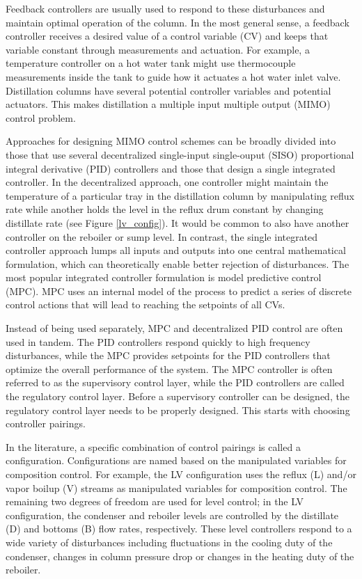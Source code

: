 Feedback controllers are usually used to respond to these disturbances and maintain optimal operation of the column.  In the most general sense, a feedback controller receives a desired value of a control variable (CV) and keeps that variable constant through measurements and actuation. For example, a temperature controller on a hot water tank might use thermocouple measurements inside the tank to guide how it actuates a hot water inlet valve. Distillation columns have several potential controller variables and potential actuators. This makes distillation a multiple input multiple output (MIMO) control problem. 

Approaches for designing MIMO control schemes can be broadly divided into those that use several decentralized single-input single-ouput (SISO) proportional integral derivative (PID) controllers\citep{Behroozsarand2012, Shen1994, Lin2006, Luyben1986} and those that design a single integrated controller.\citep{Martin2013, Mesbah2017,Spielberg2019,Terzi2020} In the decentralized approach, one controller might maintain the temperature of a particular tray in the distillation column by manipulating reflux rate while another holds the level in the reflux drum constant by changing distillate rate (see Figure \ref{lv_config}). It would be common to also have another controller on the reboiler or sump level.\citep{Skogestad2007} In contrast, the single integrated controller approach lumps all inputs and outputs into one central mathematical formulation, which can theoretically enable better rejection of disturbances.\citep{Mesbah2017} The most popular integrated controller formulation is model predictive control (MPC). MPC uses an internal model of the process to predict a series of discrete control actions that will lead to reaching the setpoints of all CVs. 

Instead of being used separately, MPC and decentralized PID control are often used in tandem. The PID controllers respond quickly to high frequency disturbances, while the MPC provides setpoints for the PID controllers that optimize the overall performance of the system.\citep{Skogestad2007} The MPC controller is often referred to as the supervisory control layer, while the PID controllers are called the regulatory control layer. Before a supervisory controller can be designed, the regulatory control layer needs to be properly designed. This starts with choosing controller pairings.

In the literature, a specific combination of control pairings is called a configuration. Configurations are named based on the manipulated variables for composition control. For example, the LV configuration uses the reflux (L) and/or vapor boilup (V) streams as manipulated variables for composition control.\citep{Skogestad2007}  The remaining two degrees of freedom are used for level control; in the LV configuration, the condenser and reboiler levels are controlled by the distillate (D) and bottoms (B) flow rates, respectively. These level controllers respond to a wide variety of disturbances including fluctuations in the cooling duty of the condenser, changes in column pressure drop or changes in the heating duty of the reboiler.


